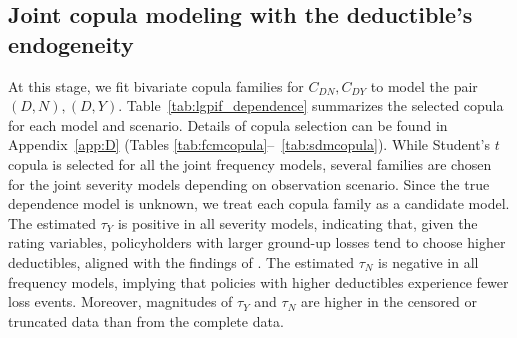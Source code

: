 \documentclass[11pt]{article}
\newcommand{\rev}[1]{{\color{blue}#1}}
\begin{document}
{%

\FloatBarrier

\subsection{Joint copula modeling with the deductible's endogeneity}\label{sec:jointcopula}

At this stage, we fit {bivariate copula families} for $C_{DN},C_{DY}$ to model the pair $(D, N),(D, Y)$. Table~\ref{tab:lgpif_dependence} summarizes the selected copula for each model and scenario. Details of copula selection can be found in Appendix~\ref{app:D} (Tables \ref{tab:fcmcopula}--~\ref{tab:sdmcopula}). \rev{While Student's $t$ copula is selected for all the joint frequency models, several families are chosen for the joint severity models depending on observation scenario. Since the true dependence model is unknown, we treat each copula family as a candidate model. The estimated $\tau_Y$ is positive in all severity models, indicating that, given the rating variables, policyholders with larger ground-up losses tend to choose higher deductibles, aligned with the findings of \citet{shi2022copula}. The estimated $\tau_N$ is negative in all frequency models, implying that policies with higher deductibles experience fewer loss events. Moreover, magnitudes of $\tau_Y$ and $\tau_N$ are higher in the censored or truncated data than from the complete data.}

}
\end{document}
